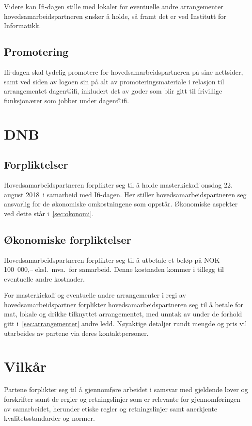 \documentclass[norsk,a4paper]{article}
\begin{document}
Videre kan Ifi-dagen stille med lokaler for eventuelle andre arrangementer
hovedsamarbeidspartneren ønsker å holde, så framt det er ved Institutt for
Informatikk.

\subsection{Promotering}
Ifi-dagen skal tydelig promotere for hovedsamarbeidspartneren på sine
nettsider, samt ved siden av logoen sin på alt av promoteringsmateriale i
relasjon til arrangementet dagen@ifi, inkludert det av goder som blir gitt til
frivillige funksjonærer som jobber under dagen@ifi.

\section{DNB}
\subsection{Forpliktelser}
Hovedsamarbeidspartneren forplikter seg til å holde masterkickoff onsdag 22.
august 2018\ i samarbeid med Ifi-dagen. Her stiller hovedsamarbeidspartneren
seg ansvarlig for de økonomiske omkostningene som oppstår. Økonomiske aspekter
ved dette står i~\ref{sec:okonomi}.

\subsection{Økonomiske forpliktelser\label{sec:okonomi}}
Hovedsamarbeidspartneren forplikter seg til å utbetale et beløp på NOK
100\ 000,-- eksl.\ mva.\ for samarbeid. Denne kostnaden kommer i tillegg til
eventuelle andre kostnader.

For masterkickoff og eventuelle andre arrangementer i regi av
hovedsamarbeidspartner forplikter hovedsamarbeidspartneren seg til å betale for
mat, lokale og drikke tilknyttet arrangementet, med unntak av under de forhold
gitt i~\ref{sec:arrangementer} andre ledd. Nøyaktige detaljer rundt mengde og
pris vil utarbeides av partene via deres kontaktpersoner.

\section{Vilkår}
Partene forplikter seg til å gjennomføre arbeidet i samsvar med gjeldende lover
og forskrifter samt de regler og retningslinjer som er relevante for
gjennomføringen av samarbeidet, herunder etiske regler og retningslinjer samt
anerkjente kvalitetsstandarder og normer.
\end{document}
